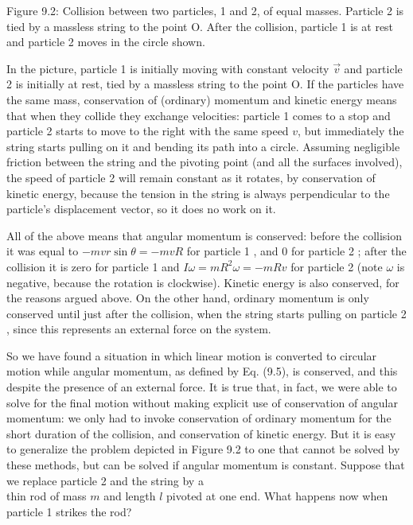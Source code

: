 \documentclass[10pt]{article}
\begin{document}
Figure 9.2: Collision between two particles, 1 and 2, of equal masses. Particle 2 is tied by a massless string to the point O. After the collision, particle 1 is at rest and particle 2 moves in the circle shown.

In the picture, particle 1 is initially moving with constant velocity $\vec{v}$ and particle 2 is initially at rest, tied by a massless string to the point O. If the particles have the same mass, conservation of (ordinary) momentum and kinetic energy means that when they collide they exchange velocities: particle 1 comes to a stop and particle 2 starts to move to the right with the same speed $v$, but immediately the string starts pulling on it and bending its path into a circle. Assuming negligible friction between the string and the pivoting point (and all the surfaces involved), the speed of particle 2 will remain constant as it rotates, by conservation of kinetic energy, because the tension in the string is always perpendicular to the particle's displacement vector, so it does no work on it.

All of the above means that angular momentum is conserved: before the collision it was equal to $-m v r \sin \theta=-m v R$ for particle 1 , and 0 for particle 2 ; after the collision it is zero for particle 1 and $I \omega=m R^{2} \omega=-m R v$ for particle 2 (note $\omega$ is negative, because the rotation is clockwise). Kinetic energy is also conserved, for the reasons argued above. On the other hand, ordinary momentum is only conserved until just after the collision, when the string starts pulling on particle 2 , since this represents an external force on the system.

So we have found a situation in which linear motion is converted to circular motion while angular momentum, as defined by Eq. (9.5), is conserved, and this despite the presence of an external force. It is true that, in fact, we were able to solve for the final motion without making explicit use of conservation of angular momentum: we only had to invoke conservation of ordinary momentum for the short duration of the collision, and conservation of kinetic energy. But it is easy to generalize the problem depicted in Figure 9.2 to one that cannot be solved by these methods, but can be solved if angular momentum is constant. Suppose that we replace particle 2 and the string by a\\
thin rod of mass $m$ and length $l$ pivoted at one end. What happens now when particle 1 strikes the rod?
\end{document}
